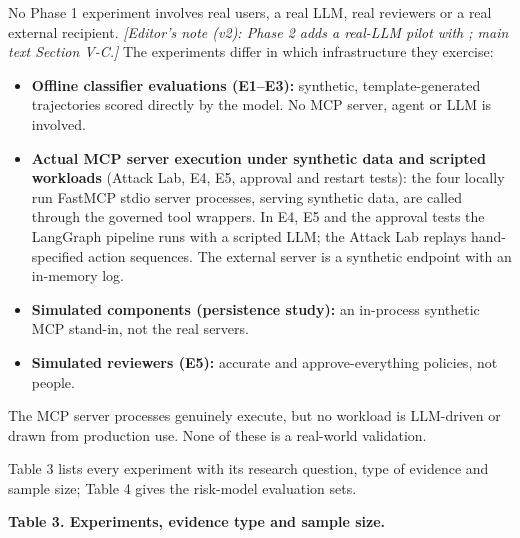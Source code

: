 \documentclass[10pt]{article}
\begin{document}
No Phase 1 experiment involves real users, a real LLM, real reviewers or a real external recipient. \emph{[Editor's note (v2): Phase 2 adds a real-LLM pilot with ; main text Section V-C.]} The experiments differ in which infrastructure they exercise:

\begin{itemize}
\item \textbf{Offline classifier evaluations (E1--E3):} synthetic, template-generated trajectories scored directly by the model. No MCP server, agent or LLM is involved.
\item \textbf{Actual MCP server execution under synthetic data and scripted workloads} (Attack Lab, E4, E5, approval and restart tests): the four locally run FastMCP stdio server processes, serving synthetic data, are called through the governed tool wrappers. In E4, E5 and the approval tests the LangGraph pipeline runs with a scripted LLM; the Attack Lab replays hand-specified action sequences. The external server is a synthetic endpoint with an in-memory log.
\item \textbf{Simulated components (persistence study):} an in-process synthetic MCP stand-in, not the real servers.
\item \textbf{Simulated reviewers (E5):} accurate and approve-everything policies, not people.
\end{itemize}

The MCP server processes genuinely execute, but no workload is LLM-driven or drawn from production use. None of these is a real-world validation.

Table 3 lists every experiment with its research question, type of evidence and sample size; Table 4 gives the risk-model evaluation sets.

\textbf{Table 3. Experiments, evidence type and sample size.}
\end{document}
